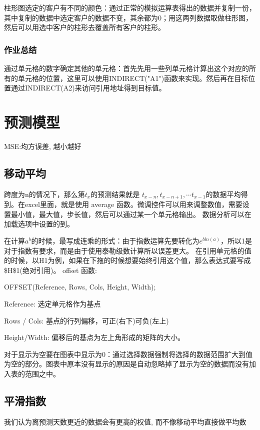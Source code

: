 \documentclass[10pt, a4paper]{article}
\begin{document}
                柱形图选定的客户有不同的颜色：通过正常的模拟运算表得出的数据并复制一份，其中复制的数据中选定客户的数据不变，其余都为0；用这两列数据取做柱形图，然后可以用选中客户的柱形去覆盖所有客户的柱形。
            \subsubsection{作业总结}
                通过单元格的数字确定其他的单元格：首先先用一些列单元格计算出这个对应的所有的单元格的位置，这里可以使用INDIRECT("A1")函数来实现。然后再在目标位置通过INDIRECT(A2)来访问引用地址得到目标值。


\section{预测模型}
    MSE:均方误差, 越小越好
    \subsection{移动平均}
        跨度为n的情况下，那么第$t_x$的预测结果就是 $t_{x-n}, t_{x - n+1}, \cdots t_{x - 1}$的数据平均得到。在excel里面，就是使用 average 函数。微调控件可以用来调整数值，需要设置最小值，最大值，步长值，然后可以通过某一个单元格输出。 数据分析可以在加载选项中设置的到。 

        在计算$a^b$的时候，最写成连乘的形式：由于指数运算先要转化为$e^{bln(a)}$，所以1是对于指数有要求，而是由于使用泰勒级数计算所以误差更大。 在引用单元格的值的时候，以H1为例，如果在下拖的时候想要始终引用这个值，那么表达式要写成\$H\$1(绝对引用)。 offset 函数:
    \begin{center}
        OFFSET(Reference, Rows, Cols, Height, Width); 
    \end{center}
        
        \quad Reference: 选定单元格作为基点
        
        \quad Rows / Cols: 基点的行列偏移，可正(右下)可负(左上)

        \quad Height/Width: 偏移后的基点为左上角形成的矩阵的大小。

        对于显示为空要在图表中显示为0：通过选择数据强制将选择的数据范围扩大到值为空的部分。图表中原本没有显示的原因是自动忽略掉了显示为空的数据而没有加入表的范围之中。  
    \subsection{平滑指数}
        我们认为离预测天数更近的数据会有更高的权值, 而不像移动平均直接做平均数
        
\end{document}
